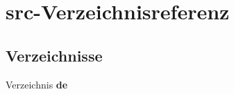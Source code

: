 \section{src-\/\-Verzeichnisreferenz}
\label{dir_633230f2541cc6043bb1043dac67bf98}
\subsection*{Verzeichnisse}
\begin{DoxyCompactItemize}
\item 
Verzeichnis {\bf de}
\end{DoxyCompactItemize}
